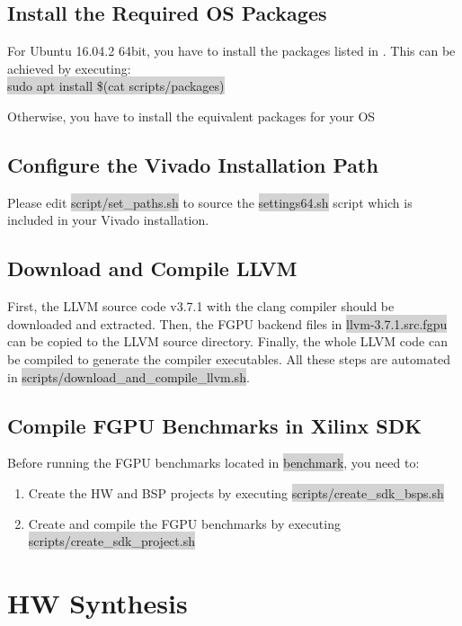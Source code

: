 \documentclass[11pt]{article}
\begin{document}
\subsection{Install the Required OS Packages}
    For Ubuntu 16.04.2 64bit, you have to install the packages listed in .
    This can be achieved by executing: \\
    \centering \colorbox{lightGray}{ sudo apt install \$(cat scripts/packages) }\\
    \raggedright
    Otherwise, you have to install the equivalent packages for your OS

\subsection{Configure the Vivado Installation Path}
Please edit \colorbox{lightGray}{script/set\_paths.sh} to source the \colorbox{lightGray}{settings64.sh} script
which is included in your Vivado installation.

\subsection{Download and Compile LLVM}
First, the LLVM source code v3.7.1 with the clang compiler should be downloaded and extracted.
Then, the FGPU backend files in \colorbox{lightGray}{llvm-3.7.1.src.fgpu} can be copied to the LLVM source directory.
Finally, the whole LLVM code can be compiled to generate the compiler executables.
All these steps are automated in \colorbox{lightGray}{scripts/download\_and\_compile\_llvm.sh}.

\subsection{Compile FGPU Benchmarks in Xilinx SDK}
Before running the FGPU benchmarks located in \colorbox{lightGray}{benchmark}, you need to:
\begin{enumerate}
  \item Create the HW and BSP projects by executing \colorbox{lightGray}{scripts/create\_sdk\_bsps.sh}
  \item Create and compile the FGPU benchmarks by executing \colorbox{lightGray}{scripts/create\_sdk\_project.sh}
\end{enumerate}

\section{HW Synthesis}
\end{document}
